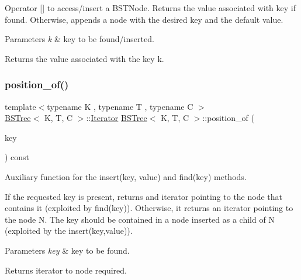 Operator \mbox{[}\mbox{]} to access/insert a B\+S\+T\+Node. Returns the value associated with key if found. Otherwise, appends a node with the desired key and the default value. 


\begin{DoxyParams}{Parameters}
{\em k} & key to be found/inserted. \\
\hline
\end{DoxyParams}
\begin{DoxyReturn}{Returns}
the value associated with the key k. 
\end{DoxyReturn}
\mbox{\label{class_b_s_tree_a0a386f0ffde9a0fe2e5df8562b719184}} 
\subsubsection{\texorpdfstring{position\+\_\+of()}{position\_of()}}
{\footnotesize\ttfamily template$<$typename K , typename T , typename C $>$ \\
\hyperlink{class_b_s_tree}{B\+S\+Tree}$<$ K, T, C $>$\+::\hyperlink{class_b_s_tree_1_1_iterator}{Iterator} \hyperlink{class_b_s_tree}{B\+S\+Tree}$<$ K, T, C $>$\+::position\+\_\+of (\begin{DoxyParamCaption}\item[{const K \&}]{key }\end{DoxyParamCaption}) const\hspace{0.3cm}{\ttfamily [private]}}



Auxiliary function for the insert(key, value) and find(key) methods. 

If the requested key is present, returns and iterator pointing to the node that contains it (exploited by find(key)). Otherwise, it returns an iterator pointing to the node N. The key should be contained in a node inserted as a child of N (exploited by the insert(key,value)).


\begin{DoxyParams}{Parameters}
{\em key} & key to be found. \\
\hline
\end{DoxyParams}
\begin{DoxyReturn}{Returns}
iterator to node required. 
\end{DoxyReturn}
\mbox{\label{class_b_s_tree_a468dcc29b6786ddc5de05c314d644ce1}} 
